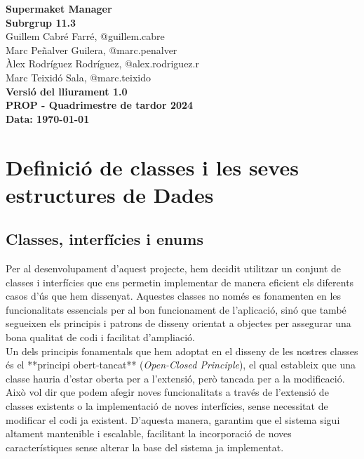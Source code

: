 \documentclass[a4paper,12pt]{report}
\newcommand{\titolPractica}{Supermaket Manager}
\newcommand{\identificadorEquip}{Subrgrup 11.3}
\newcommand{\PROPquatrimestre}{PROP - Quadrimestre de tardor 2024}
\newcommand{\versioLliurament}{Versió del lliurament 1.0}
\begin{document}
	\begin{titlepage}
		\begin{center}
			{\Large \textbf{\titolPractica}} \\[10cm]
			\textbf{\large \identificadorEquip} \\[1cm]
			Guillem Cabré Farré, \small{@guillem.cabre} \\
			Marc Peñalver Guilera, \small{@marc.penalver} \\
			Àlex Rodríguez Rodríguez, \small{@alex.rodriguez.r} \\
			Marc Teixidó Sala, \small{@marc.teixido} \\[2cm]
			\textbf{\versioLliurament} \\
			\textbf{\PROPquatrimestre} \\
			\textbf{Data: \today}
		\end{center}
	\end{titlepage}

	\tableofcontents
	\clearpage

	\chapter{Definició de classes i les seves estructures de Dades}
	
	\section{Classes, interfícies i enums}
	
	Per al desenvolupament d'aquest projecte, hem decidit utilitzar un conjunt de classes i interfícies que ens permetin implementar de manera eficient els diferents casos d'ús que hem dissenyat. Aquestes classes no només es fonamenten en les funcionalitats essencials per al bon funcionament de l'aplicació, sinó que també segueixen els principis i patrons de disseny orientat a objectes per assegurar una bona qualitat de codi i facilitat d'ampliació. \\
	
	Un dels principis fonamentals que hem adoptat en el disseny de les nostres classes és el **principi obert-tancat** (\textit{Open-Closed Principle}), el qual estableix que una classe hauria d'estar oberta per a l'extensió, però tancada per a la modificació. Això vol dir que podem afegir noves funcionalitats a través de l'extensió de classes existents o la implementació de noves interfícies, sense necessitat de modificar el codi ja existent. D'aquesta manera, garantim que el sistema sigui altament mantenible i escalable, facilitant la incorporació de noves característiques sense alterar la base del sistema ja implementat.\\
	
\end{document}
